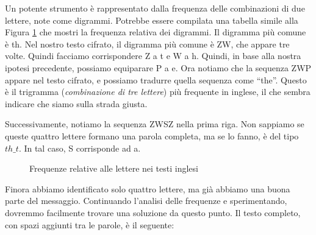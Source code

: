 Un potente strumento è rappresentato dalla frequenza delle combinazioni di due lettere, note come digrammi.
Potrebbe essere compilata una tabella simile alla Figura \ref{fig:frequenza-lettere-testo-cifrato} che mostri
la frequenza relativa dei digrammi. Il digramma più comune è th. Nel nostro testo cifrato, il digramma più
comune è ZW, che appare tre volte. Quindi facciamo corrispondere Z a t e W a h. Quindi, in base alla nostra
ipotesi precedente, possiamo equiparare P a e. Ora notiamo che la sequenza ZWP appare nel testo cifrato, e possiamo
tradurre quella sequenza come ``the''. Questo è il trigramma (\textit{combinazione di tre lettere}) più frequente in inglese,
il che sembra indicare che siamo sulla strada giusta.

Successivamente, notiamo la sequenza ZWSZ nella prima riga. Non sappiamo se queste quattro lettere formano una
parola completa, ma se lo fanno, è del tipo $th\_t$. In tal caso, S corrisponde ad a.

\begin{figure}[H]
    \centering
        \caption{Frequenze relative alle lettere nei testi inglesi}
        \label{fig:frequenza-lettere-testo-cifrato}
\end{figure}
Finora abbiamo identificato solo quattro lettere, ma già abbiamo una buona parte del messaggio.
Continuando l'analisi delle frequenze e sperimentando, dovremmo facilmente trovare una soluzione
da questo punto. Il testo completo, con spazi aggiunti tra le parole, è il seguente:

